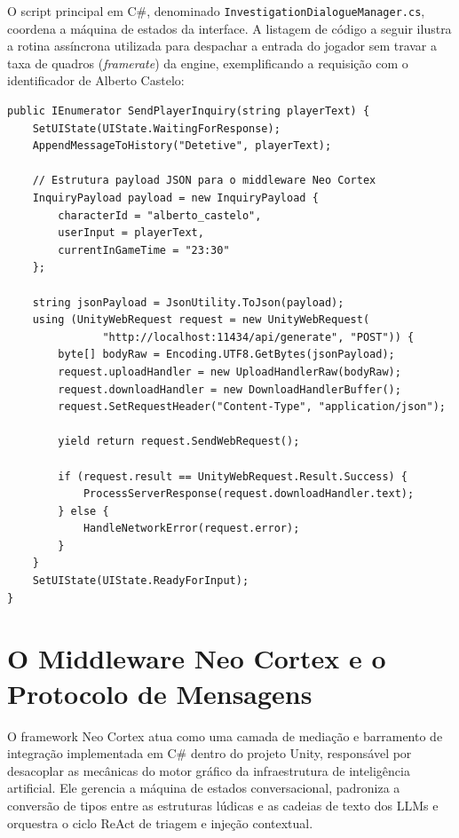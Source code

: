O script principal em C\#, denominado \texttt{InvestigationDialogueManager.cs}, coordena a máquina de estados da interface. A listagem de código a seguir ilustra a rotina assíncrona utilizada para despachar a entrada do jogador sem travar a taxa de quadros (\textit{framerate}) da engine, exemplificando a requisição com o identificador de Alberto Castelo:

\begin{lstlisting}[language={[Sharp]C}, caption={Rotina assíncrona em C\# para comunicação com o middleware Neo Cortex.}, label={lst:envio_mensagem}]
public IEnumerator SendPlayerInquiry(string playerText) {
    SetUIState(UIState.WaitingForResponse);
    AppendMessageToHistory("Detetive", playerText);

    // Estrutura payload JSON para o middleware Neo Cortex
    InquiryPayload payload = new InquiryPayload {
        characterId = "alberto_castelo",
        userInput = playerText,
        currentInGameTime = "23:30"
    };

    string jsonPayload = JsonUtility.ToJson(payload);
    using (UnityWebRequest request = new UnityWebRequest(
               "http://localhost:11434/api/generate", "POST")) {
        byte[] bodyRaw = Encoding.UTF8.GetBytes(jsonPayload);
        request.uploadHandler = new UploadHandlerRaw(bodyRaw);
        request.downloadHandler = new DownloadHandlerBuffer();
        request.SetRequestHeader("Content-Type", "application/json");

        yield return request.SendWebRequest();

        if (request.result == UnityWebRequest.Result.Success) {
            ProcessServerResponse(request.downloadHandler.text);
        } else {
            HandleNetworkError(request.error);
        }
    }
    SetUIState(UIState.ReadyForInput);
}
\end{lstlisting}

\section{O Middleware Neo Cortex e o Protocolo de Mensagens}
\label{sec:dev_neocortex}

O framework Neo Cortex atua como uma camada de mediação e barramento de integração implementada em C\# dentro do projeto Unity, responsável por desacoplar as mecânicas do motor gráfico da infraestrutura de inteligência artificial. Ele gerencia a máquina de estados conversacional, padroniza a conversão de tipos entre as estruturas lúdicas e as cadeias de texto dos LLMs e orquestra o ciclo ReAct de triagem e injeção contextual.

